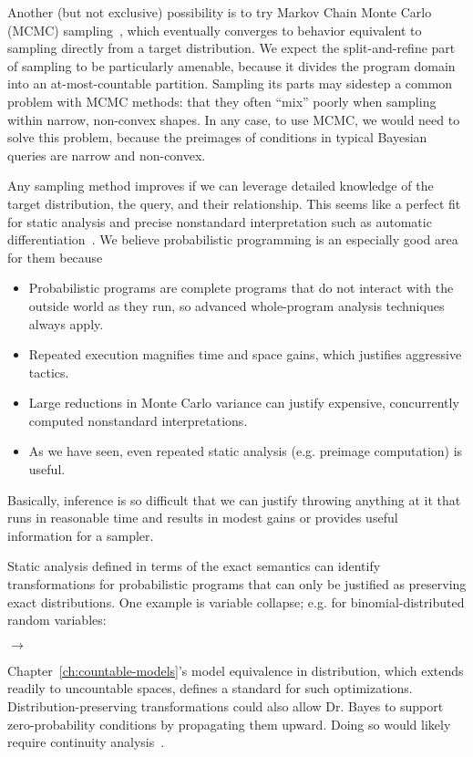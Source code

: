 Another (but not exclusive) possibility is to try Markov Chain Monte Carlo (MCMC) sampling~\cite[Chapter 12]{cit:degroot-2012book-probability}, which eventually converges to behavior equivalent to sampling directly from a target distribution.
We expect the split-and-refine part of sampling to be particularly amenable, because it divides the program domain into an at-most-countable partition.
Sampling its parts may sidestep a common problem with MCMC methods: that they often ``mix'' poorly when sampling within narrow, non-convex shapes.
In any case, to use MCMC, we would need to solve this problem, because the preimages of conditions in typical Bayesian queries are narrow and non-convex.

Any sampling method improves if we can leverage detailed knowledge of the target distribution, the query, and their relationship.
This seems like a perfect fit for static analysis and precise nonstandard interpretation such as automatic differentiation~\cite{cit:elliott-2009icfp-differentiation}.
We believe probabilistic programming is an especially good area for them because
\begin{itemize}
	\item Probabilistic programs are complete programs that do not interact with the outside world as they run, so advanced whole-program analysis techniques always apply.
	\item Repeated execution magnifies time and space gains, which justifies aggressive tactics.
	\item Large reductions in Monte Carlo variance can justify expensive, concurrently computed nonstandard interpretations.
	\item As we have seen, even repeated static analysis (e.g. preimage computation) is useful.
\end{itemize}
Basically, inference is so difficult that we can justify throwing anything at it that runs in reasonable time and results in modest gains or provides useful information for a sampler.

Static analysis defined in terms of the exact semantics can identify transformations for probabilistic programs that can only be justified as preserving exact distributions.
One example is variable collapse; e.g. for binomial-distributed random variables:
\begin{center}
 \tab $\longrightarrow$ \tab {}
\end{center}
Chapter~\ref{ch:countable-models}'s model equivalence in distribution, which extends readily to uncountable spaces, defines a standard for such optimizations.
Distribution-preserving transformations could also allow Dr. Bayes to support zero-probability conditions by propagating them upward.
Doing so would likely require continuity analysis~\cite{cit:chaudhuri-2010-continuity}.

